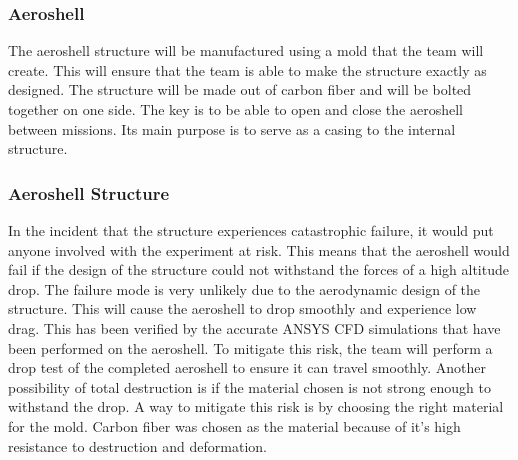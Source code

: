 \subsubsection{Aeroshell}
\indent\indent The aeroshell structure will be manufactured using a mold that the team will create. This will ensure that the team is able to make the structure exactly as designed. The structure will be made out of carbon fiber and will be bolted together on one side. The key is to be able to open and close the aeroshell between missions. Its main purpose is to serve as a casing to the internal structure.  
\begin{table}[H]
\caption{\label{tab:aeroshell_strucure} Aeroshell Structure Failure Modes \& Probabilities}
\centering

\end{table}
\subsubsection*{Aeroshell Structure}
\indent\indent In the incident that the structure experiences catastrophic failure, it would put anyone involved with the experiment at risk. This means that the aeroshell would fail if the design of the structure could not withstand the forces of a high altitude drop. The failure mode is very unlikely due to the aerodynamic design of the structure. This will cause the aeroshell to drop smoothly and experience low drag. This has been verified by the accurate ANSYS CFD simulations that have been performed on the aeroshell. To mitigate this risk, the team will perform a drop test of the completed aeroshell to ensure it can travel smoothly. Another possibility of total destruction is if the material chosen is not strong enough to withstand the drop. A way to mitigate this risk is by choosing the right material for the mold. Carbon fiber was chosen as the material because of it's high resistance to destruction and deformation.

